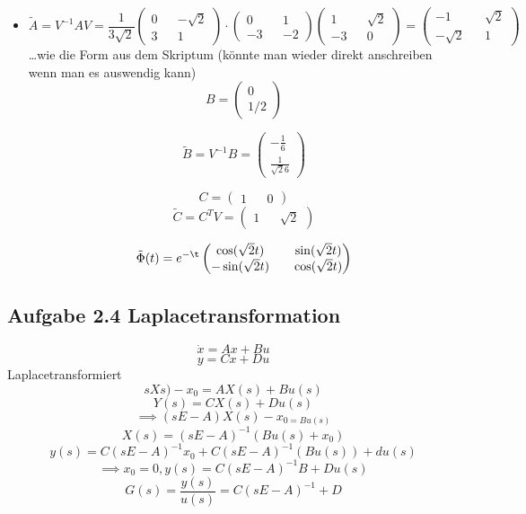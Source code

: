 \documentclass[a4paper]{article}
\begin{document}
\begin{itemize}
  \item
      \[ \tilde{A}=V^{-1}AV=\frac{1}{3\sqrt{2} } \begin{pmatrix}
      0 && -\sqrt{2} \\
      3 && 1
      \end{pmatrix} \cdot 
  \begin{pmatrix}
  0 && 1\\
  -3 && -2
  \end{pmatrix} \begin{pmatrix}
  1 && \sqrt{2} \\
  -3 && 0
  \end{pmatrix} =\begin{pmatrix}
  -1 && \sqrt{2} \\
  -\sqrt{2}  && 1
  \end{pmatrix} \]
\ldots  wie die Form aus dem Skriptum (könnte man wieder direkt anschreiben wenn man es auswendig kann)
  \[ B=\begin{pmatrix} 0\\ 1/2\end{pmatrix} \]
  
\[ \tilde{B}=V^{-1}B=\begin{pmatrix} -\frac{1}{6}\\ \frac{1}{\sqrt{2}6 }\end{pmatrix} \]

      \[ C=\begin{pmatrix} 1&& 0\end{pmatrix} \]
      \[ \tilde{C}=C^{T}V= \begin{pmatrix} 1&& \sqrt{2} \end{pmatrix}\]
     
      \[ \tilde{\Phi}(t)=e^{-\t}\begin{pmatrix}
      \cos(\sqrt{2}t ) && \sin(\sqrt{2}t )\\
      -\sin(\sqrt{2}t ) && \cos(\sqrt{2}t )
      \end{pmatrix}  \]

\end{itemize}

\subsection*{Aufgabe 2.4 Laplacetransformation}
\[ \dot x =Ax+Bu \]
\[ y=Cx+Du \]
Laplacetransformiert
\[ sXs)-x_{0}= AX(s)+Bu(s) \]
\[ Y(s)=CX(s)+Du(s) \]
\[ \implies (sE-A)X(s)-x_{0=Bu(s)} \]
\[ X(s)=(sE-A)^{-1}(Bu(s)+x_{0}) \]
\[ y(s)=C(sE-A)^{-1}x_{0}+C(sE-A)^{-1}(Bu(s))+du(s)\]
\[ \implies x_{0}=0, y(s)={C(sE-A)^{-1}B+D}u(s) \]
\[ G(s)=\frac{y(s)}{u(s)}=C(sE-A)^{-1}+D \]
\end{document}
